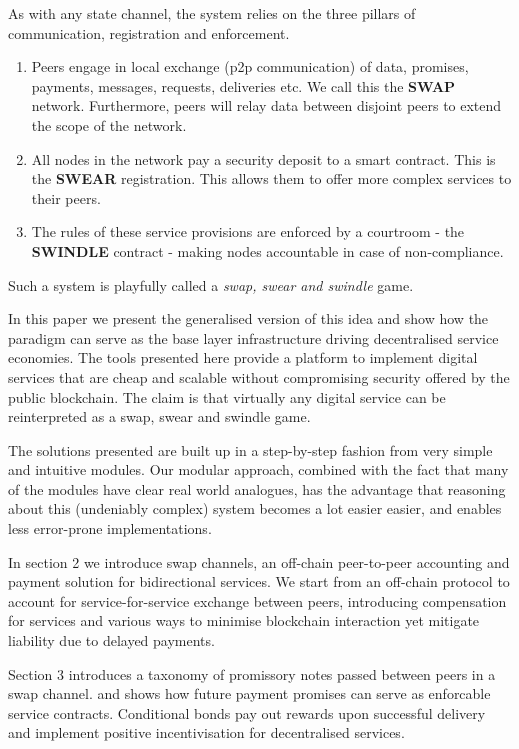 \documentclass[a4paper,10pt]{article}
\begin{document}
As with any state channel, the system relies on the three pillars of communication, registration and enforcement.
\begin{enumerate}
 \item Peers engage in local exchange (p2p communication) of data, promises, payments, messages, requests, deliveries etc. We call this the \textbf{SWAP} network. Furthermore, peers will relay data between disjoint peers to extend the scope of the network.
 \item All nodes in the network pay a security deposit to a smart contract. This is the \textbf{SWEAR} registration. This allows them to offer more complex services to their peers.
 \item The rules of these service provisions are enforced by a courtroom - the \textbf{SWINDLE} contract - making nodes accountable in case of non-compliance.
\end{enumerate}

Such a system is playfully called a \emph{swap, swear and swindle} game.

In this paper we present the generalised version of this idea and show how the paradigm can serve as the base layer infrastructure driving decentralised service economies.
The tools presented here provide a platform to implement digital services that are cheap and scalable without compromising security offered by the public blockchain.
The claim is that virtually any digital service can be reinterpreted as a swap, swear and swindle game.

The solutions presented are built up in a step-by-step fashion from very simple and intuitive
modules.%
Our modular approach, combined with the fact that many of the modules have clear real world analogues, has the advantage that reasoning about this (undeniably complex) system becomes a lot easier easier, and enables less error-prone implementations.

In section 2 we introduce swap channels, an off-chain peer-to-peer accounting and
payment solution for bidirectional services. We start from an off-chain protocol to
account for service-for-service exchange between peers, introducing compensation for services
and various ways to minimise blockchain interaction yet mitigate liability due to delayed payments.

Section 3 introduces a taxonomy of promissory notes passed between peers in a swap channel.
and shows how future payment promises can serve as enforcable service contracts.
Conditional bonds pay out rewards upon successful delivery and
implement positive incentivisation for decentralised services.
\end{document}
